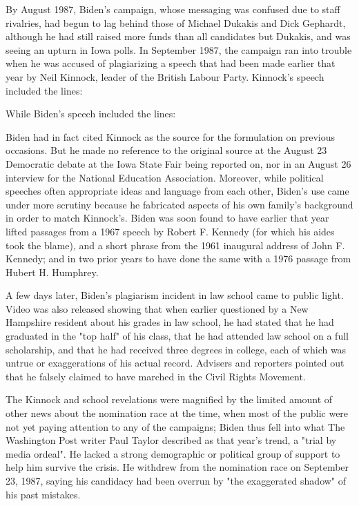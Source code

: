 By August 1987, Biden's campaign, whose messaging was confused due to
staff rivalries, had begun to lag behind those of Michael Dukakis and
Dick Gephardt, although he had still raised more funds than all
candidates but Dukakis, and was seeing an upturn in Iowa polls. In
September 1987, the campaign ran into trouble when he was accused of
plagiarizing a speech that had been made earlier that year by Neil
Kinnock, leader of the British Labour Party. Kinnock's speech included
the lines:

While Biden's speech included the lines:

Biden had in fact cited Kinnock as the source for the formulation on
previous occasions. But he made no reference to the original source at
the August 23 Democratic debate at the Iowa State Fair being reported
on, nor in an August 26 interview for the National Education
Association. Moreover, while political speeches often appropriate ideas
and language from each other, Biden's use came under more scrutiny
because he fabricated aspects of his own family's background in order to
match Kinnock's. Biden was soon found to have earlier that year lifted
passages from a 1967 speech by Robert F. Kennedy (for which his aides
took the blame), and a short phrase from the 1961 inaugural address of
John F. Kennedy; and in two prior years to have done the same with a
1976 passage from Hubert H. Humphrey.

A few days later, Biden's plagiarism incident in law school came to
public light. Video was also released showing that when earlier
questioned by a New Hampshire resident about his grades in law school,
he had stated that he had graduated in the "top half" of his class, that
he had attended law school on a full scholarship, and that he had
received three degrees in college, each of which was untrue or
exaggerations of his actual record. Advisers and reporters pointed out
that he falsely claimed to have marched in the Civil Rights Movement.

The Kinnock and school revelations were magnified by the limited amount
of other news about the nomination race at the time, when most of the
public were not yet paying attention to any of the campaigns; Biden thus
fell into what The Washington Post writer Paul Taylor described as that
year's trend, a "trial by media ordeal". He lacked a strong demographic
or political group of support to help him survive the crisis. He
withdrew from the nomination race on September 23, 1987, saying his
candidacy had been overrun by "the exaggerated shadow" of his past
mistakes.

